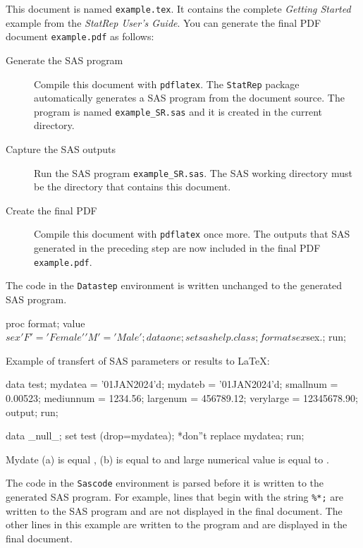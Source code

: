 \documentclass{article}
\begin{document}
This document is named \texttt{example.tex}. 
It contains the complete \textit{Getting Started}
example from the \textit{StatRep User's Guide}.
You can generate the final PDF document \texttt{example.pdf} as follows:

\begin{description}
\item[Generate the SAS program]\mbox{}\newline
Compile this document with \texttt{pdflatex}.
The \texttt{StatRep} package automatically generates a SAS program from
the document source. The program is named
\texttt{example\_SR.sas} and it is created in the current directory.

\item[Capture the SAS outputs]\mbox{}\newline
Run the SAS program \texttt{example\_SR.sas}. 
The SAS working directory must be the directory that contains this document.

\item[Create the final PDF]\mbox{}\newline
Compile this document with \texttt{pdflatex} once more. The outputs that SAS generated
in the preceding step are now included in the final PDF \texttt{example.pdf}.
\end{description}

The code in the \texttt{Datastep} environment is written
unchanged to the generated SAS program.

\begin{Datastep}
proc format;
   value $sex 'F' = 'Female' 'M' = 'Male';
data one;
   set sashelp.class;
   format sex $sex.;
run;
\end{Datastep}


Example of transfert of SAS parameters or results to \LaTeX :

\begin{Sascode}
	data test;
	mydatea = '01JAN2024'd;
	mydateb = '01JAN2024'd;
	smallnum = 0.00523;
	mediunnum = 1234.56;
	largenum = 456789.12;
	verylarge = 12345678.90;
	output;
	run;
	
	data _null_;
	set test (drop=mydatea); *don''t replace mydatea;
	run;
\end{Sascode}

Mydate (a) is equal \mydatea, (b) is equal to \mydateb{} and large numerical value is equal to \largenum.


  The code in the \texttt{Sascode} environment is parsed before it is
  written to the generated SAS program. For example, lines that begin with the string
  \texttt{\%*;} are written to the SAS program and are not displayed in the 
  final document. The other lines in this example are written to the program 
  and are displayed in the final document.
  
\end{document}
